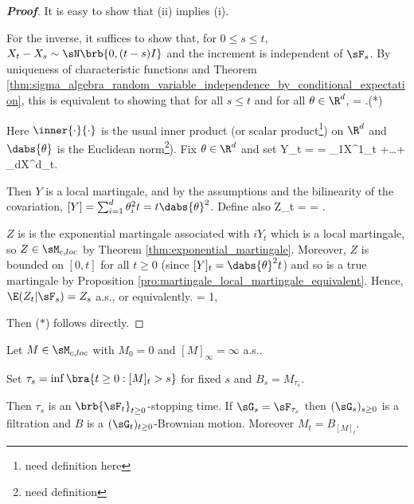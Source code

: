 \begin{proof}[\bf Proof]
It is easy to show that (ii) implies (i).

For the inverse, it suffices to show that, for $0 \leq s \leq t$, $X_t - X_s \sim \sN\brb{0, (t - s)I}$ and the increment is independent of $\sF_s$. By uniqueness of characteristic functions and Theorem \ref{thm:sigma_algebra_random_variable_independence_by_conditional_expectation}, this is equivalent to showing that for all $s \leq t$ and for all $\theta \in \R^d$,
\be%
\E{} = \exp{}.\quad (*)
\ee

Here $\inner{\cdot}{\cdot}$ is the usual inner product (or scalar product\footnote{need definition here}) on $\R^d$ and $\dabs{\theta}$ is the Euclidean norm\footnote{need definition}). Fix $\theta\in \R^d$ and set
\be
Y_t =  = \theta_1X^1_t +\dots+ \theta_dX^d_t.
\ee

Then $Y$ is a local martingale, and by the assumptions and the bilinearity of the covariation, $[Y ] = \sum^d_{i=1} \theta^2_i t = t\dabs{\theta}^2$. Define also
\be
Z_t = \exp{} = \exp{}.
\ee

$Z$ is is the exponential martingale associated with $iY_t$ which is a local martingale, so $Z \in \sM_{c,loc}$ by Theorem \ref{thm:exponential_martingale}. Moreover, $Z$ is bounded on $[0, t]$ for all $t \geq 0$ (since $[Y ]_t = \dabs{\theta}^2 t$) and so is a true martingale by Proposition \ref{pro:martingale_local_martingale_equivalent}. Hence, $\E(Z_t|\sF_s) = Z_s$ a.s., or equivalently.
\be
\E{} = 1,\quad{}
\ee

Then ($*$) follows directly.
\end{proof}


\begin{theorem}\label{thm:dubins_schwarz}
Let $M \in \sM_{c,loc}$ with $M_0 = 0$ and $[M]_\infty = \infty$ a.s..

Set $\tau_s = \inf\bra{t \geq 0 : [M]_t > s}$ for fixed $s$ and $B_s = M_{\tau_s}$.

Then $\tau_s$ is an $\brb{\sF_t}_{t\geq0}$-stopping time. If $\sG_s = \sF_{\tau_s}$ then $(\sG_s)_{s\geq0}$ is a filtration and $B$ is a $(\sG_t)_{t\geq0}$-Brownian motion. Moreover $M_t =
B_{[M]_t}$.
\end{theorem}

